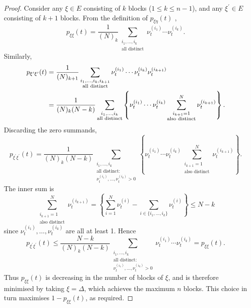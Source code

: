 \documentclass{article}
\newcommand{\1}[1]{\mathbbm{1}_{#1}}
\begin{document}
\begin{proof}
Consider any $\xi \in E$ consisting of $k$ blocks ($1\leq k\leq n-1$), and any $\xi^\prime\in E$ consisting of $k+1$ blocks. 
From the definition of $p_{\xi\eta}(t)$ \citep[Equation (1)]{koskela2018},
\begin{equation}
p_{\xi\xi}(t) = \frac{1}{(N)_k} \sum_{\substack{i_1,\dots,i_k \\ \text{all distinct}}} \nu_t^{(i_1)} \cdots \nu_t^{(i_k)} .
\end{equation}
Similarly,
\begin{align}
p_{\xi^\prime\xi^\prime}(t) &= \frac{1}{(N)_{k+1}} \sum_{\substack{i_1,\dots,i_k, i_{k+1} \\ \text{all distinct}}} \nu_t^{(i_1)} \cdots \nu_t^{(i_k)} \nu_t^{(i_{k+1})} \notag\\
&= \frac{1}{(N)_k(N-k)} \sum_{\substack{i_1,\dots,i_k \\ \text{all distinct}}} \left\{ \nu_t^{(i_1)} \cdots \nu_t^{(i_k)} \sum_{\substack{i_{k+1}=1 \\ \text{also distinct}}}^N \nu_t^{(i_{k+1})} \right\} .
\end{align}
Discarding the zero summands,
\begin{equation}
p_{\xi^\prime\xi^\prime}(t) = \frac{1}{(N)_k(N-k)} \sum_{\substack{i_1,\dots,i_k \\ \text{all distinct:} \\ \nu_t^{(i_1)},\dots,\nu_t^{(i_k)} > 0 }} \left\{ \nu_t^{(i_1)} \cdots \nu_t^{(i_k)} \sum_{\substack{i_{k+1}=1 \\ \text{also distinct}}}^N \nu_t^{(i_{k+1})} \right\} .
\end{equation}
The inner sum is
\begin{equation}
\sum_{\substack{i_{k+1}=1 \\ \text{also distinct}}}^N \nu_t^{(i_{k+1})} =
\left\{ \sum_{i=1}^N \nu_t^{(i)} -  \sum_{i\in\{i_1,\dots,i_k\} } \nu_t^{(i)} \right\}
\leq N - k
\end{equation}
since $\nu_t^{(i_1)},\dots,\nu_t^{(i_k)} $ are all at least 1.
Hence
\begin{equation}
p_{\xi^\prime\xi^\prime}(t)
\leq  \frac{N-k}{(N)_k(N-k)} \sum_{\substack{i_1,\dots,i_k \\ \text{all distinct:} \\ \nu_t^{(i_1)},\dots,\nu_t^{(i_k)} > 0 }} \nu_t^{(i_1)} \cdots \nu_t^{(i_k)} 
= p_{\xi\xi}(t) .
\end{equation}
Thus $p_{\xi\xi}(t)$ is decreasing in the number of blocks of $\xi$, and is therefore minimised by taking $\xi = \Delta$, which achieves the maximum $n$ blocks. This choice in turn maximises $1-p_{\xi\xi}(t)$, as required.
\end{proof}
\end{document}
